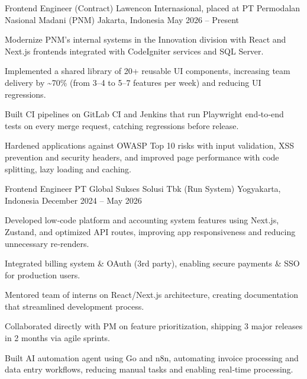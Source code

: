 
\begin{cventries}
    \cventry
    {Frontend Engineer (Contract)} %
    {Lawencon Internasional, placed at PT Permodalan Nasional Madani (PNM)} %
    {Jakarta, Indonesia} %
    {May 2026 – Present} %
    {
      \begin{cvitems} %
        \item {Modernize PNM's internal systems in the Innovation division with React and Next.js frontends integrated with CodeIgniter services and SQL Server.}
        \item {Implemented a shared library of 20+ reusable UI components, increasing team delivery by \textasciitilde70\% (from 3–4 to 5–7 features per week) and reducing UI regressions.}
        \item {Built CI pipelines on GitLab CI and Jenkins that run Playwright end‑to‑end tests on every merge request, catching regressions before release.}
        \item {Hardened applications against OWASP Top 10 risks with input validation, XSS prevention and security headers, and improved page performance with code splitting, lazy loading and caching.}
      \end{cvitems}
    }

    \cventry
    {Frontend Engineer} %
    {PT Global Sukses Solusi Tbk (Run System)} %
    {Yogyakarta, Indonesia} %
    {December 2024 – May 2026} %
    {
      \begin{cvitems} %
        \item {Developed low‑code platform and accounting system features using Next.js, Zustand, and optimized API routes, improving app responsiveness and reducing unnecessary re‑renders.}
        \item { Integrated billing system \& OAuth (3rd party), enabling secure payments \& SSO for production users.}
        \item {Mentored team of interns on React/Next.js architecture, creating documentation that streamlined development process.}
        \item {Collaborated directly with PM on feature prioritization, shipping 3 major releases in 2 months via agile sprints.}
        \item{ Built AI automation agent using Go and n8n, automating invoice processing and data entry workflows, reducing manual tasks and enabling real‑time processing.}
      \end{cvitems}
    }


\end{cventries}
